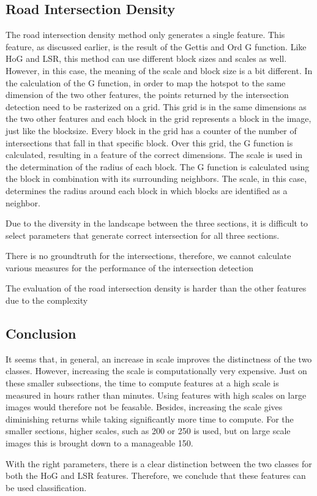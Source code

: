\subsection{Road Intersection Density}

The road intersection density method only generates a single feature. This feature, as discussed earlier, is the result of the Gettis and Ord G function. Like HoG and LSR, this method can use different block sizes and scales as well. However, in this case, the meaning of the scale and block size is a bit different. In the calculation of the G function, in order to map the hotspot to the same dimension of the two other features, the points returned by the intersection detection need to be rasterized on a grid. This grid is in the same dimensions as the two other features and each block in the grid represents a block in the image, just like the blocksize. Every block in the grid has a counter of the number of intersections that fall in that specific block. Over this grid, the G function is calculated, resulting in a feature of the correct dimensions. The scale is used in the determination of the radius of each block. The G function is calculated using the block in combination with its surrounding neighbors. The scale, in this case, determines the radius around each block in which blocks are identified as a neighbor.


Due to the diversity in the landscape between the three sections, it is difficult
to select parameters that generate correct intersection for all three sections.

There is no groundtruth for the intersections, therefore, we cannot calculate various
measures for the performance of the intersection detection


The evaluation of the road intersection density is harder than the other features
due to the complexity 

\subsection{Conclusion}

It seems that, in general, an increase in scale improves the distinctness of
the two classes. However, increasing the scale is computationally very
expensive. Just on these smaller subsections, the time to compute features at
a high scale is measured in hours rather than minutes. Using features with high
scales on large images would therefore not be feasable. Besides, increasing the
scale gives diminishing returns while taking significantly more time to
compute. For the smaller sections, higher scales, such as 200 or 250 is
used, but on large scale images this is brought down to a manageable 150.

With the right parameters, there is a clear distinction between the two classes
for both the HoG and LSR features. Therefore, we conclude that these features
can be used classification. 



